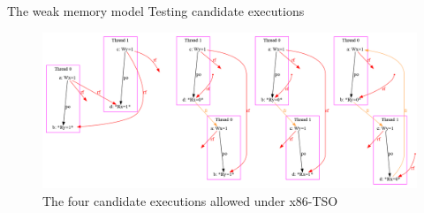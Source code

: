 \documentclass{beamer}
\begin{document}
\begin{frame}{The weak memory model} {Testing candidate executions}
\vspace{10pt}
\begin{minipage}{.3\linewidth}
\hfill
\end{minipage}
%
\noindent\begin{minipage}{.4\linewidth}
\end{minipage}
%
\noindent\begin{minipage}{.25\linewidth}
\end{minipage}
\vspace{-5pt}
\begin{figure}
\includegraphics[width=\linewidth]{img/candidate.png}
\caption{The four candidate executions allowed under x86-TSO}
\end{figure}

\end{frame}
\end{document}
